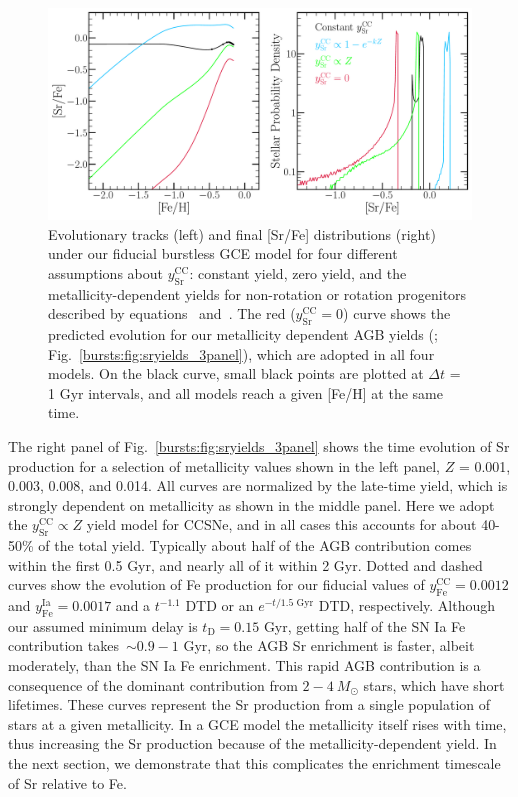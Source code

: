 \begin{figure} %
\includegraphics[scale = 0.45]{sr_yield_assumptions.pdf}
\caption{
Evolutionary tracks (left) and final [Sr/Fe] distributions (right) under our 
fiducial burstless GCE model for four different assumptions about 
$y_\text{Sr}^\text{CC}$: constant yield, zero yield, and the 
metallicity-dependent yields for non-rotation or rotation progenitors 
described by equations~ and~. 
The red ($y_\text{Sr}^\text{CC} = 0$) curve shows the predicted evolution for 
our metallicity dependent AGB yields (\citealp{Cristallo2011}; 
Fig.~\ref{bursts:fig:sryields_3panel}), which are adopted in all four models. On the 
black curve, small black points are plotted at $\Delta t$ = 1 Gyr intervals, 
and all models reach a given [Fe/H] at the same time. 
}
\label{bursts:fig:sr_yields}
\end{figure}

The right panel of Fig.~\ref{bursts:fig:sryields_3panel} shows the time evolution of 
Sr production for a selection of metallicity values shown in the left panel, 
$Z$ = 0.001, 0.003, 0.008, and 0.014. All curves are normalized by the 
late-time yield, which is strongly dependent on metallicity as shown in the 
middle panel. Here we adopt the $y_\text{Sr}^\text{CC} \propto Z$ yield model 
for CCSNe, and in all cases this accounts for about 40-50\% of the total yield. 
Typically about half of the AGB contribution comes within the first 0.5 Gyr, 
and nearly all of it within 2 Gyr. Dotted and dashed curves show the evolution 
of Fe production for our fiducial values of $y_\text{Fe}^\text{CC} = 0.0012$ 
and $y_\text{Fe}^\text{Ia} = 0.0017$ and a $t^{-1.1}$ DTD or an 
$e^{-t/1.5\text{ Gyr}}$ DTD, respectively. Although our assumed minimum delay 
is $t_\text{D} = 0.15$ Gyr, getting half of the SN Ia Fe contribution 
takes~$\sim0.9 - 1$ Gyr, so the AGB Sr enrichment is faster, albeit moderately, 
than the SN Ia Fe enrichment. This rapid AGB contribution is a consequence of 
the dominant contribution from $2 - 4\ M_\odot$ stars, which have short 
lifetimes. These curves represent the Sr production from a single population of 
stars at a given metallicity. In a GCE model the metallicity itself rises with 
time, thus increasing the Sr production because of the metallicity-dependent 
yield. In the next section, we demonstrate that this complicates the 
enrichment timescale of Sr relative to Fe. 

